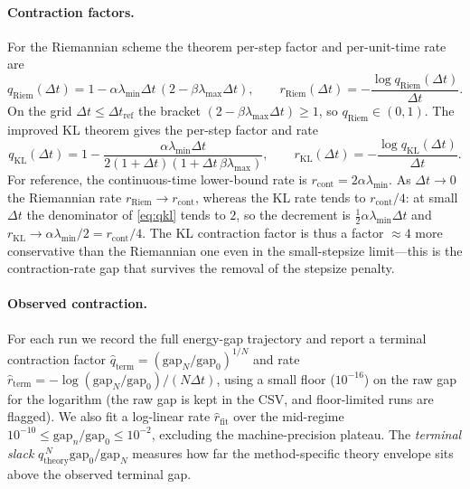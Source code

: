 \documentclass[11pt]{article}
\begin{document}
\paragraph{Contraction factors.}
For the Riemannian scheme the theorem per-step factor and per-unit-time rate are
\begin{equation}\label{eq:qriem}
q_{\mathrm{Riem}}(\Delta t)=1-\alpha\lambda_{\min}\Delta t\,(2-\beta\lambda_{\max}\Delta t),
\qquad
r_{\mathrm{Riem}}(\Delta t)=-\frac{\log q_{\mathrm{Riem}}(\Delta t)}{\Delta t}.
\end{equation}
On the grid $\Delta t\le\Delta t_{\mathrm{ref}}$ the bracket
$(2-\beta\lambda_{\max}\Delta t)\ge1$, so $q_{\mathrm{Riem}}\in(0,1)$. The improved
KL theorem gives the per-step factor and rate
\begin{equation}\label{eq:qkl}
q_{\mathrm{KL}}(\Delta t)=1-\frac{\alpha\lambda_{\min}\Delta t}
{2(1+\Delta t)(1+\Delta t\,\beta\lambda_{\max})},
\qquad
r_{\mathrm{KL}}(\Delta t)=-\frac{\log q_{\mathrm{KL}}(\Delta t)}{\Delta t}.
\end{equation}
For reference, the continuous-time lower-bound rate is
$r_{\mathrm{cont}}=2\alpha\lambda_{\min}$. As $\Delta t\to0$ the Riemannian rate
$r_{\mathrm{Riem}}\to r_{\mathrm{cont}}$, whereas the KL rate tends to
$r_{\mathrm{cont}}/4$: at small $\Delta t$ the denominator of \eqref{eq:qkl}
tends to $2$, so the decrement is $\tfrac12\alpha\lambda_{\min}\Delta t$ and
$r_{\mathrm{KL}}\to\alpha\lambda_{\min}/2=r_{\mathrm{cont}}/4$. The KL contraction
factor is thus a factor $\approx4$ more conservative than the Riemannian one even
in the small-stepsize limit---this is the contraction-rate gap that survives the
removal of the stepsize penalty.

\paragraph{Observed contraction.}
For each run we record the full energy-gap trajectory and report a terminal
contraction factor
$\hat q_{\mathrm{term}}=(\mathrm{gap}_N/\mathrm{gap}_0)^{1/N}$ and rate
$\hat r_{\mathrm{term}}=-\log(\mathrm{gap}_N/\mathrm{gap}_0)/(N\Delta t)$, using a
small floor ($10^{-16}$) on the raw gap for the logarithm (the raw gap is kept in
the CSV, and floor-limited runs are flagged). We also fit a log-linear rate
$\hat r_{\mathrm{fit}}$ over the mid-regime
$10^{-10}\le\mathrm{gap}_n/\mathrm{gap}_0\le10^{-2}$, excluding the
machine-precision plateau. The \emph{terminal slack}
$q_{\mathrm{theory}}^{\,N}\mathrm{gap}_0/\mathrm{gap}_N$ measures how far the
method-specific theory envelope sits above the observed terminal gap.
\end{document}
